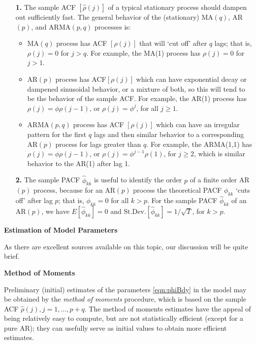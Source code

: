 \begin{enumerate}
\item[\textbf{1.}] The sample ACF $[\hat{\rho}(j)]$ of a typical stationary process should dampen out sufficiently fast. The general behavior of the (stationary) MA$(q)$, AR$(p)$, and ARMA$(p,q)$ processes is: 

\begin{itemize}
\item MA$(q)$ process has ACF $[\rho(j)]$ that will `cut off' after $q$ lags; that is, $\rho(j) = 0$ for $j > q$. For example, the MA(1) process has $\rho(j)= 0$ for $j > 1$.

\item AR$(p)$ process has ACF$[\rho(j)]$ which can have exponential decay or dampened sinusoidal behavior, or a mixture of both, so this will tend to be the behavior of the sample ACF. For example, the AR(1) process has $\rho(j)=\phi \rho(j-1)$,  or $\rho(j) = \phi^j$, for all $j \geq 1$.

\item ARMA$(p,q)$ process has ACF $[\rho(j)]$ which can have an irregular pattern for the first $q$ lags and then similar behavior to a corresponding AR$(p)$ process for lags greater than $q$. For example, the ARMA(1,1) has $\rho(j) = \phi \rho(j-1)$, or $\rho(j)= \phi^{j-1} \rho(1)$, for $j \geq 2$, which is similar behavior to the AR(1) after lag 1.
\end{itemize}

\item[\textbf{2.}] The sample PACF $\hat{\phi}_{kk}$ is useful to identify the order $p$ of a finite order AR$(p)$ process, because for an AR$(p)$ process the theoretical PACF $\phi_{kk}$ `cuts off' after lag $p$; that is, $\phi_{kk}= 0$ for all $k>p$. For the sample PACF $\hat{\phi}_{kk}$ of an AR$(p)$, we have $E[\hat{\phi}_{kk}]= 0$ and $\text{St.Dev.}[\hat{\phi}_{kk}]=1 / \sqrt{T}$, for $k > p$. 
\end{enumerate}

                                      
{\noindent\bfseries\large Estimation of Model Parameters} \twomedskip


As there are excellent sources available on this topic, our discussion will be quite brief.


\noindent \textbf{Method of Moments} \twomedskip


Preliminary (initial) estimates of the parameters \eqref{eqn:phiBdy} in the model may be obtained by the \textit{method of moments} procedure, which is based on the sample ACF $\hat{\rho}(j), j= 1, \ldots,  p+q$. The method of moments estimates have the appeal of being relatively easy to compute, but are not statistically efficient (except for a pure AR); they can usefully serve as initial values to obtain more efficient estimates.


